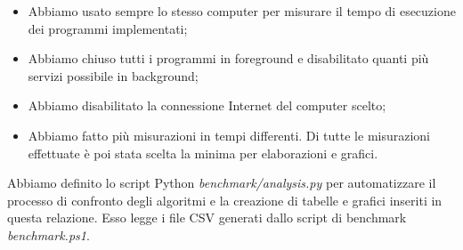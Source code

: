 \begin{itemize}
    \item Abbiamo usato sempre lo stesso computer per misurare il tempo di esecuzione dei programmi implementati;
    \item Abbiamo chiuso tutti i programmi in foreground e disabilitato quanti più servizi possibile in background;
    \item Abbiamo disabilitato la connessione Internet del computer scelto;
    \item Abbiamo fatto più misurazioni in tempi differenti. Di tutte le misurazioni effettuate è poi stata scelta la minima per elaborazioni e grafici.
\end{itemize}

\noindent Abbiamo definito lo script Python \textit{benchmark/analysis.py} per automatizzare il processo di confronto degli algoritmi e la creazione di tabelle e grafici inseriti in questa relazione. Esso legge i file CSV generati dallo script di benchmark \textit{benchmark.ps1}.
